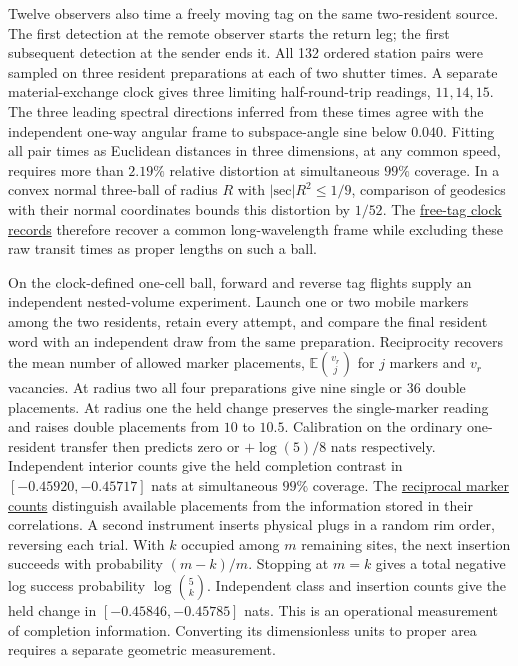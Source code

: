 \documentclass[11pt]{article}
\begin{document}
Twelve observers also time a freely moving tag on the same two-resident
source. The first detection at the remote observer starts the return
leg; the first subsequent detection at the sender ends it. All 132
ordered station pairs were sampled on three resident preparations at
each of two shutter times. A separate material-exchange clock gives
three limiting half-round-trip readings, $11,14,15$. The three leading
spectral directions inferred from these times agree with the
independent one-way angular frame to subspace-angle sine below $0.040$.
Fitting all pair times as Euclidean distances in three dimensions,
at any common speed, requires more than $2.19\%$ relative distortion
at simultaneous $99\%$ coverage. In a convex normal three-ball of
radius $R$ with $|\mathrm{sec}|R^2\le1/9$, comparison of geodesics
with their normal coordinates bounds this distortion by $1/52$.
The \href{https://github.com/FloatingPragma/observer-patch-holography/tree/main/model/experiments/interval_echo_einstein_station/equilibrium_refinement/tracer_flux/bearings/round_trip}{free-tag clock records}
therefore recover a common long-wavelength frame while excluding
these raw transit times as proper lengths on such a ball.

On the clock-defined one-cell ball, forward and reverse tag flights
supply an independent nested-volume experiment. Launch one or two
mobile markers among the two residents, retain every attempt, and
compare the final resident word with an independent draw from the
same preparation. Reciprocity recovers the mean number of allowed
marker placements, $\mathbb E\binom{v_r}{j}$ for $j$ markers and $v_r$
vacancies. At radius two all four preparations give nine single or
36 double placements. At radius one the held change preserves the
single-marker reading and raises double placements from $10$ to $10.5$.
Calibration on the ordinary one-resident transfer then predicts zero
or $+\log(5)/8$ nats respectively. Independent interior counts give the
held completion contrast in $[-0.45920,-0.45717]$ nats at simultaneous
$99\%$ coverage. The
\href{https://github.com/FloatingPragma/observer-patch-holography/tree/main/model/experiments/interval_echo_einstein_station/equilibrium_refinement/nested_volumes}{reciprocal marker counts}
distinguish available placements from the information stored in their
correlations. A second instrument inserts physical plugs in a random
rim order, reversing each trial. With $k$ occupied among $m$ remaining
sites, the next insertion succeeds with probability $(m-k)/m$.
Stopping at $m=k$ gives a total negative log success probability
$\log\binom{5}{k}$. Independent class and insertion counts give the
held change in $[-0.45846,-0.45785]$ nats. This is an operational
measurement of completion information. Converting its dimensionless
units to proper area requires a separate geometric measurement.
\end{document}

